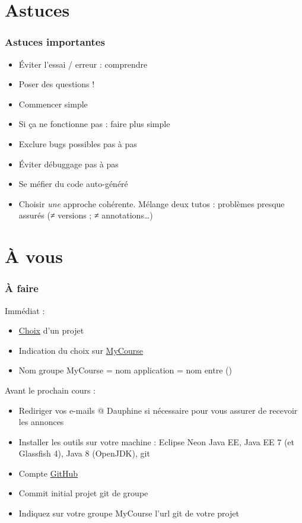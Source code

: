 \documentclass[english, french]{beamer}
\begin{document}
\section{Astuces}
\begin{frame}
	\frametitle{Astuces importantes}
	\begin{itemize}
		\item Éviter l’essai / erreur : comprendre
		\item Poser des questions !
		\item Commencer simple
		\item Si ça ne fonctionne pas : faire plus simple
		\item Exclure bugs possibles pas à pas
		\item Éviter débuggage pas à pas
		\item Se méfier du code auto-généré
		\item Choisir \emph{une} approche cohérente. Mélange deux tutos : problèmes presque assurés ({}≠ versions ; ≠ annotations…)
	\end{itemize}
\end{frame}

\section{À vous}
\begin{frame}
	\frametitle{À faire}
	Immédiat :
	\begin{itemize}
		\item \href{https://github.com/oliviercailloux/projets}{Choix} d’un projet
		\item Indication du choix sur \href{https://mycourse.dauphine.fr/webapps/blackboard/execute/courseMain?course_id=_34753_1}{MyCourse}
			\item Nom groupe MyCourse = nom application = nom entre ()
	\end{itemize}
	Avant le prochain cours :
	\begin{itemize}
		\item Rediriger vos e-mails @ Dauphine si nécessaire pour vous assurer de recevoir les annonces
		\item Installer les outils sur votre machine : Eclipse Neon Java EE, Java EE 7 (et Glassfish 4), Java 8 (OpenJDK), git
		\item Compte \href{https://github.com/}{GitHub}
		\item Commit initial projet git de groupe
		\item Indiquez sur votre groupe MyCourse l’url git de votre projet
	\end{itemize}
\end{frame}
\end{document}
